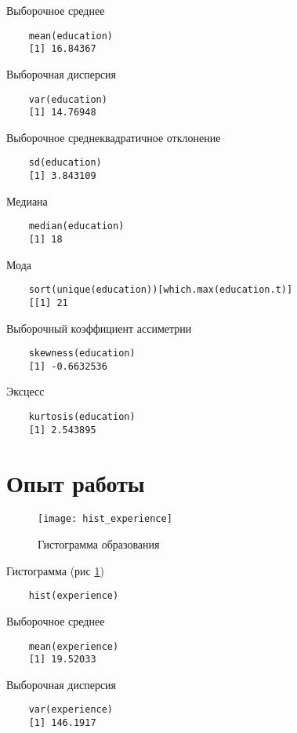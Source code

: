 \documentclass[12pt,a4paper,titlepage]{article}
\begin{document}
  Выборочное среднее
  \begin{lstlisting}
    mean(education)
    [1] 16.84367
  \end{lstlisting}

  Выборочная дисперсия
  \begin{lstlisting}
    var(education)
    [1] 14.76948
  \end{lstlisting}

  Выборочное среднеквадратичное отклонение
  \begin{lstlisting}
    sd(education)
    [1] 3.843109
  \end{lstlisting}

  Медиана
  \begin{lstlisting}
    median(education)
    [1] 18
  \end{lstlisting}

  Мода
  \begin{lstlisting}
    sort(unique(education))[which.max(education.t)]
    [[1] 21
  \end{lstlisting}

  Выборочный коэффициент ассиметрии
  \begin{lstlisting}
    skewness(education)
    [1] -0.6632536
  \end{lstlisting}

  Эксцесс
  \begin{lstlisting}
    kurtosis(education)
    [1] 2.543895
  \end{lstlisting}

\section{Опыт работы}
  \begin{figure}
    \texttt{[image: hist\_experience]}
    \caption{Гистограмма образования}
    \label{experience_hist}
  \end{figure}

  Гистограмма (рис \ref{experience_hist})
  \begin{lstlisting}
    hist(experience)
  \end{lstlisting}

  Выборочное среднее
  \begin{lstlisting}
    mean(experience)
    [1] 19.52033
  \end{lstlisting}

  Выборочная дисперсия
  \begin{lstlisting}
    var(experience)
    [1] 146.1917
  \end{lstlisting}
\end{document}
